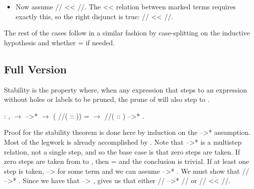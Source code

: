 \documentclass[12pt]{report}
\begin{document}
\begin{itemize}
\begin{itemize}
\item  Now assume // << //. The << relation between
    marked terms requires exactly this, so the right disjunct is
    true:   // <<   //.

\end{itemize}

\end{itemize}


The rest of the cases follow in a similar fashion by case-splitting
on the inductive hypothesis and whether  =  if needed.




\subsection{Full Version}



 Stability is the property where, when any expression  that
steps to an expression  without holes or labels to be pruned, the
prune of  will also step to . \begin{coqdoccode}
\coqdocemptyline
\coqdocindent{1.00em}
  : \coqdockw{\ensuremath{\forall}}   ,\coqdoceol
\coqdocindent{2.00em}
  \ensuremath{\rightarrow}\coqdoceol
\coqdocindent{2.00em}
 -->*  \ensuremath{\rightarrow}\coqdoceol
\coqdocindent{2.00em}
(  //\coqdocvar{\_}( :: )) =  \ensuremath{\rightarrow}\coqdoceol
\coqdocindent{2.00em}
  //\coqdocvar{\_}( :: ) -->* .\coqdoceol
\coqdocemptyline
\end{coqdoccode}
Proof for the stability theorem is done here by induction on the
     -->*  assumption. Most of the legwork is already
    accomplished by . Note that  -->*  is
    a multistep relation, not a single step, and so the base case is
    that zero steps are taken. If zero steps are taken from  to
    , then  =  and the conclusion is trivial. If at least one
    step is taken,  -->  for some term  and we can assume          -->* . We must show that // -->* .  Since we have that     --> ,  gives us that either                // -->* // or // << //.
\end{document}
